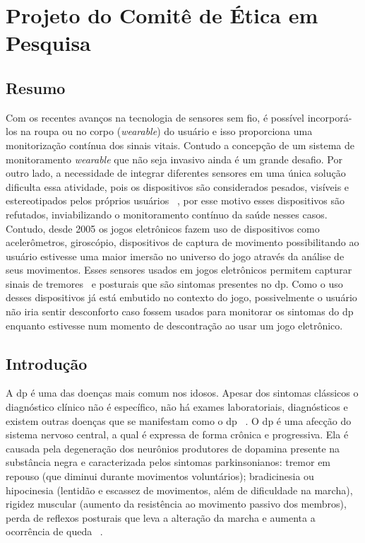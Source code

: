 \chapter{Projeto do Comitê de Ética em Pesquisa} \label{sec:comite}
\section{Resumo}
Com os recentes avanços na tecnologia de sensores sem fio, é possível incorporá-los na roupa ou no corpo (\textit{wearable}) do usuário e isso proporciona uma monitorização contínua dos sinais vitais. Contudo a concepção de um sistema de monitoramento \textit{wearable} que não seja invasivo ainda é um grande desafio. Por outro lado, a necessidade de integrar diferentes sensores em uma única solução dificulta essa atividade, pois os dispositivos são considerados pesados, visíveis e estereotipados pelos próprios usuários ~\cite{aarhus_negotiating_2010}, por esse motivo esses dispositivos são refutados, inviabilizando o monitoramento contínuo da saúde nesses casos. Contudo, desde 2005 os jogos eletrônicos fazem uso de dispositivos como acelerômetros, giroscópio, dispositivos de captura de movimento possibilitando ao usuário estivesse uma maior imersão no universo do jogo através da análise de seus movimentos. Esses sensores usados em jogos eletrônicos permitem capturar sinais  de tremores~\cite{lemoyne2010} 
e posturais que são sintomas presentes no \ac{dp}. Como o uso desses dispositivos já está embutido no contexto do jogo, possivelmente o usuário não iria sentir desconforto caso fossem usados para monitorar os sintomas do \ac{dp} enquanto estivesse num momento de descontração ao usar um jogo eletrônico. 

\section{Introdução}
A \ac{dp} é uma das doenças mais comum nos idosos. Apesar dos sintomas clássicos o diagnóstico clínico não é específico, não há exames laboratoriais, diagnósticos e existem outras doenças que se manifestam como o \ac{dp} ~\cite{abn2010,tolosa06}. O \ac{dp} é uma afecção do sistema nervoso central, a qual é expressa de forma crônica e progressiva. Ela é causada pela degeneração dos neurônios produtores de dopamina presente na substância negra e caracterizada pelos sintomas parkinsonianos: tremor em repouso (que diminui durante movimentos voluntários); bradicinesia ou hipocinesia (lentidão e escassez de movimentos, além de dificuldade na marcha), rigidez muscular (aumento da resistência ao movimento passivo dos membros), perda de reflexos posturais que leva a alteração da marcha e aumenta a ocorrência de queda ~\cite{tolosa06,abn2010}. 

